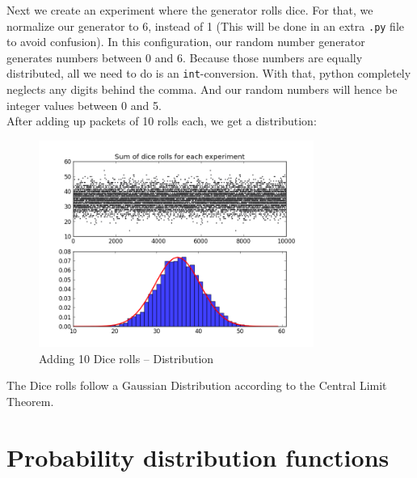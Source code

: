 \documentclass{article}
\begin{document}
Next we create an experiment where the generator rolls dice. For that, we
normalize our generator to 6, instead of 1 (This will be done in an extra
\texttt{.py} file to avoid confusion). In this configuration, our random number
generator generates numbers between 0 and 6. Because those numbers are equally
distributed, all we need to do is an \texttt{int}-conversion. With that,
python completely neglects any digits behind the comma. And our random numbers
will hence be integer values between 0 and 5. \\
After adding up packets of 10 rolls each, we get a distribution:
\begin{figure}[H]
    \centering
    \includegraphics[width=9cm]{Fig1-5.png}
    \caption{Adding 10 Dice rolls -- Distribution}
\end{figure}
The Dice rolls follow a Gaussian Distribution according to the Central Limit
Theorem.

\section{Probability distribution functions}
\end{document}
